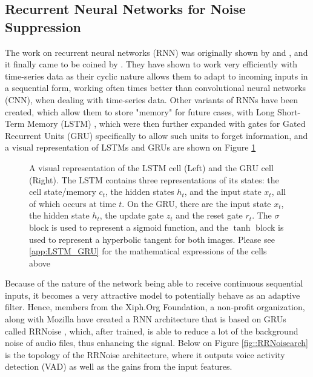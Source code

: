 \subsection{Recurrent Neural Networks for Noise Suppression} \label{sec:rnn}
The work on recurrent neural networks (RNN) was originally shown by \cite{rnn1} and \cite{rnn2}, and it finally came to be coined by \cite{rnn3}. They have shown to work very efficiently with time-series data as their cyclic nature allows them to adapt to incoming inputs in a sequential form, working often times better than convolutional neural networks (CNN), when dealing with time-series data. Other variants of RNNs have been created, which allow them to store "memory" for future cases, with Long Short-Term Memory (LSTM) \cite{lstm1}, which were then further expanded with gates for Gated Recurrent Units (GRU) \cite{gru1} specifically to allow such units to forget information, and a visual representation of LSTMs and GRUs are shown on Figure \ref{fig::LSTM_GRU}

\begin{figure}[H]
\begin{center}
    \caption{A visual representation of the LSTM cell (Left) and the GRU cell (Right). The LSTM contains three representations of its states: the cell state/memory $c_t$, the hidden states $h_t$, and the input state $x_t$, all of which occurs at time $t$. On the GRU, there are the input state $x_t$, the hidden state $h_t$, the update gate $z_t$ and the reset gate $r_t$. The $\sigma$ block is used to represent a sigmoid function, and the $\tanh$ block is used to represent a hyperbolic tangent for both images. Please see \ref{app:LSTM_GRU} for the mathematical expressions of the cells above}
    \label{fig::LSTM_GRU}
\end{center}
\end{figure}

Because of the nature of the network being able to receive continuous sequential inputs, it becomes a very attractive model to potentially behave as an adaptive filter. Hence, members from the Xiph.Org Foundation, a non-profit organization, along with Mozilla have created a RNN architecture that is based on GRUs called RRNoise \cite{rrnoise}, which, after trained, is able to reduce a lot of the background noise of audio files, thus enhancing the signal. Below on Figure \ref{fig::RRNoisearch} is the topology of the RRNoise architecture, where it outputs voice activity detection (VAD) as well as the gains from the input features.

